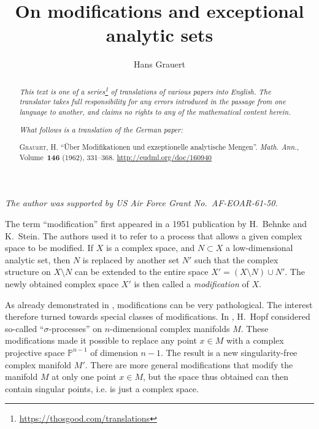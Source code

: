 \documentclass{article}
\title{On modifications and exceptional analytic sets}
\author{Hans Grauert}
\date{}
\newcommand{\doctype}{German paper}
\newcommand{\origcit}{%
  \textsc{Grauert, H.}
  ``\"{U}ber Modifikationen und exzeptionelle analytische Mengen''.
  \emph{Math. Ann.}, Volume~\textbf{146} (1962), 331--368.
  {\url{http://eudml.org/doc/160940}}%
}
\theoremstyle{plain}
\theoremstyle{definition}
\newcommand{\PP}{\mathbb{P}}
\newcommand{\oldpage}[1]{\marginpar{\footnotesize$\Big\vert$ \textit{p.~#1}}}
\begin{document}
\maketitle
\thispagestyle{fancy}

\renewcommand{\abstractname}{Translator's note.}

\begin{abstract}
  \renewcommand*{\thefootnote}{\fnsymbol{footnote}}
  \emph{This text is one of a series\footnote{\url{https://thosgood.com/translations}} of translations of various papers into English.}
  \emph{The translator takes full responsibility for any errors introduced in the passage from one language to another, and claims no rights to any of the mathematical content herein.}

  \medskip

  \emph{What follows is a translation of the \doctype:}

  \medskip\noindent
  \origcit
\end{abstract}

\setcounter{footnote}{0}

\setcounter{tocdepth}{1}
\tableofcontents



\section*{}

\emph{The author was supported by US Air Force Grant No.~AF-EOAR-61-50.}

\bigskip

\oldpage{331}
The term ``modification'' first appeared in a 1951 publication \cite{1} by H.~Behnke and K.~Stein.
The authors used it to refer to a process that allows a given complex space to be modified.
If $X$ is a complex space, and $N\subset X$ a low-dimensional analytic set, then $N$ is replaced by another set $N'$ such that the complex structure on $X\setminus N$ can be extended to the entire space $X'=(X\setminus N)\cup N'$.
The newly obtained complex space $X'$ is then called a \emph{modification} of $X$.

As already demonstrated in \cite{1}, modifications can be very pathological.
The interest therefore turned towards special classes of modifications.
In \cite{12}, H.~Hopf considered so-called ``$\sigma$-processes'' on $n$-dimensional complex manifolds $M$.
These modifications made it possible to replace any point $x\in M$ with a complex projective space $\PP^{n-1}$ of dimension $n-1$.
The result is a new singularity-free complex manifold $M'$.
There are more general modifications that modify the manifold $M$ at only one point $x\in M$, but the space thus obtained can then contain singular points, i.e. is just a complex space.
\end{document}

